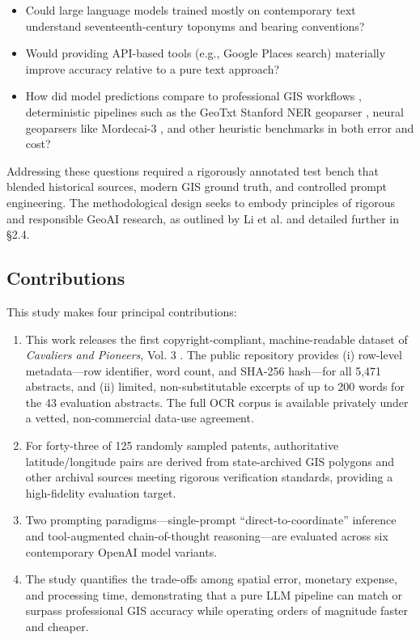 \begin{itemize}
\tightlist
\item
  Could large language models trained mostly on contemporary text
  understand seventeenth-century toponyms and bearing conventions?\\
\item
  Would providing API-based tools (e.g., Google Places search)
  materially improve accuracy relative to a pure text approach?\\
\item
  How did model predictions compare to professional GIS workflows
  \citep{Bashorun2025_gis}, deterministic pipelines such as the GeoTxt
  Stanford NER geoparser \citep{karimzadeh2019geotxt}, neural geoparsers
  like Mordecai-3 \citep{halterman2023mordecai}, and other heuristic
  benchmarks in both error and cost?
\end{itemize}

Addressing these questions required a rigorously annotated test bench
that blended historical sources, modern GIS ground truth, and controlled
prompt engineering. The methodological design seeks to embody principles
of rigorous and responsible GeoAI research, as outlined by Li et al.
\citep{Li2024_geoai} and detailed further in §2.4.

\subsection{Contributions}\label{contributions}

This study makes four principal contributions:

\begin{enumerate}
\def\labelenumi{\arabic{enumi}.}
\tightlist
\item
  This work releases the first copyright-compliant, machine-readable
  dataset of \emph{Cavaliers and Pioneers}, Vol. 3
  \citep{Nugent1979_cavaliers3}. The public repository provides (i)
  row-level metadata---row identifier, word count, and SHA-256
  hash---for all 5,471 abstracts, and (ii) limited, non-substitutable
  excerpts of up to 200 words for the 43 evaluation abstracts. The full
  OCR corpus is available privately under a vetted, non-commercial
  data-use agreement.\\
\item
  For forty-three of 125 randomly sampled patents, authoritative
  latitude/longitude pairs are derived from state-archived GIS polygons
  and other archival sources meeting rigorous verification standards,
  providing a high-fidelity evaluation target.\\
\item
  Two prompting paradigms---single-prompt ``direct-to-coordinate''
  inference and tool-augmented chain-of-thought reasoning---are
  evaluated across six contemporary OpenAI model variants.\\
\item
  The study quantifies the trade-offs among spatial error, monetary
  expense, and processing time, demonstrating that a pure LLM pipeline
  can match or surpass professional GIS accuracy while operating orders
  of magnitude faster and cheaper.
\end{enumerate}

